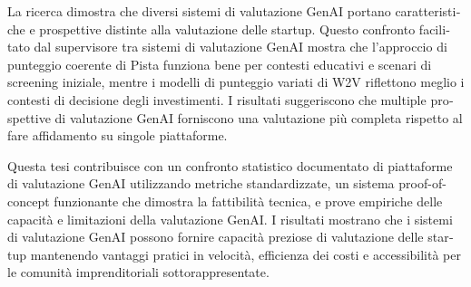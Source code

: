 \begin{otherlanguage}{italian}
La ricerca dimostra che diversi sistemi di valutazione GenAI portano caratteristiche e prospettive distinte alla valutazione delle startup. Questo confronto facilitato dal supervisore tra sistemi di valutazione GenAI mostra che l'approccio di punteggio coerente di Pista funziona bene per contesti educativi e scenari di screening iniziale, mentre i modelli di punteggio variati di W2V riflettono meglio i contesti di decisione degli investimenti. I risultati suggeriscono che multiple prospettive di valutazione GenAI forniscono una valutazione più completa rispetto al fare affidamento su singole piattaforme.

Questa tesi contribuisce con un confronto statistico documentato di piattaforme di valutazione GenAI utilizzando metriche standardizzate, un sistema proof-of-concept funzionante che dimostra la fattibilità tecnica, e prove empiriche delle capacità e limitazioni della valutazione GenAI. I risultati mostrano che i sistemi di valutazione GenAI possono fornire capacità preziose di valutazione delle startup mantenendo vantaggi pratici in velocità, efficienza dei costi e accessibilità per le comunità imprenditoriali sottorappresentate.

\end{otherlanguage}